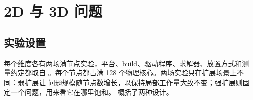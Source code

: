 \documentclass[11pt,a4paper,oneside]{report}
\begin{document}
\chapter{2D 与 3D 问题}
\label{ch:multinode}

\section{实验设置}
\label{sec:mn-setup}
每个维度各有两场满节点实验，平台、build、驱动程序、求解器、放置方式和测量约定都取自
。每个节点都占满 128 个物理核心。两场实验只在扩展场景上不同：弱扩展让
问题规模随节点数增长，以保持局部工作量大致不变；强扩展则固定一个问题，用来看它在哪里饱和。
 概括了两种设计。
\end{document}
